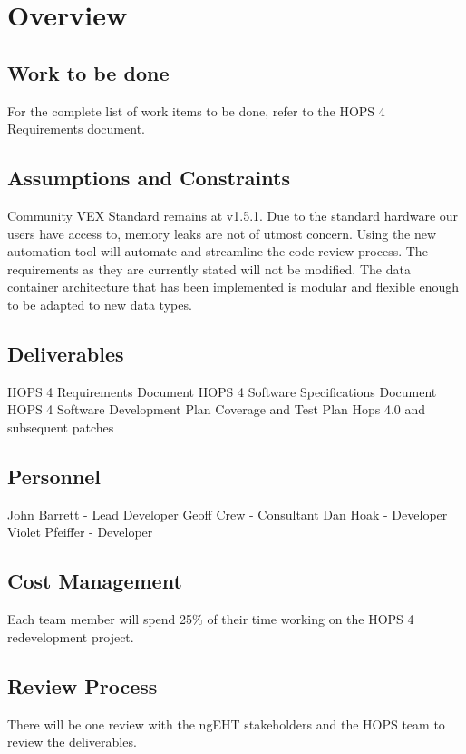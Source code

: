 %
%
\section{Overview}
\label{sec:overview}
\subsection{Work to be done}
For the complete list of work items to be done, refer to the HOPS 4 Requirements document.
\subsection{Assumptions and Constraints}
\begin{itemize}
Community VEX Standard remains at v1.5.1.
Due to the standard hardware our users have access to, memory leaks are not of utmost concern. 
Using the new automation tool will automate and streamline the code review process.
The requirements as they are currently stated will not be modified.
The data container architecture that has been implemented is modular and flexible enough to be adapted to new data types.
\end{itemize}

\subsection{Deliverables}
\begin{itemize}
HOPS 4 Requirements Document
HOPS 4 Software Specifications Document
HOPS 4 Software Development Plan
Coverage and Test Plan
Hops 4.0 and subsequent patches
\end{itemize}

\subsection{Personnel}
\begin{itemize}
John Barrett - Lead Developer
Geoff Crew - Consultant
Dan Hoak - Developer
Violet Pfeiffer - Developer
\end{itemize}

\subsection{Cost Management}
Each team member will spend 25\% of their time working on the HOPS 4 redevelopment project.

\subsection{Review Process}
There will be one review with the ngEHT stakeholders and the HOPS team to review the deliverables.
%
%
